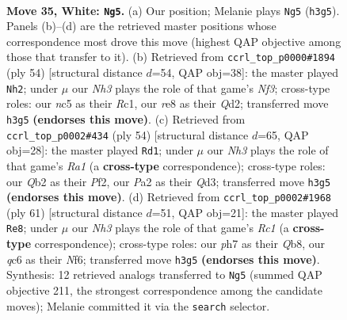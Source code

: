 \documentclass[11pt]{article}
\begin{document}
\clearpage

\begin{figure}[p]\centering
\begin{subfigure}{0.46\textwidth}\centering
\resizebox{\linewidth}{!}{%
\newchessgame
\chessboard[
  setfen={2b1r1k1/5p1p/2q3p1/2n1Pp2/p4P2/3B3N/PQP2KPP/6R1 w - - 6 35},
  showmover=false,
  pgfstyle=straightmove, color=movearrow, markmove={h3-g5}
]}
\caption{}
\end{subfigure}\hfill
\begin{subfigure}{0.46\textwidth}\centering
\resizebox{\linewidth}{!}{%
\newchessgame
\chessboard[
  setfen={2b2rk1/6pp/1pnq1p2/p2p4/3P2P1/1P3N1P/3QPPB1/2R3K1 w - - 3 28},
  showmover=false,
  pgfstyle=straightmove, color=movearrow, markmove={f3-h2}
]}
\caption{}
\end{subfigure}
\\[4pt]
\begin{subfigure}{0.46\textwidth}\centering
\resizebox{\linewidth}{!}{%
\newchessgame
\chessboard[
  setfen={3r2k1/1bq2pp1/1p1pp2p/6b1/1PPBP3/3QN2P/5PP1/R5K1 w - - 1 28},
  showmover=false,
  pgfstyle=straightmove, color=movearrow, markmove={a1-d1}
]}
\caption{}
\end{subfigure}\hfill
\begin{subfigure}{0.46\textwidth}\centering
\resizebox{\linewidth}{!}{%
\newchessgame
\chessboard[
  setfen={1qr3k1/5pp1/1p3nn1/p2b2Np/1P1N4/P3Q2P/5PP1/1R3BK1 b - - 1 31},
  showmover=false,
  pgfstyle=straightmove, color=movearrow, markmove={c8-e8}
]}
\caption{}
\end{subfigure}
\caption{\textbf{Move 35, White: \texttt{Ng5}.} (a) Our position; Melanie plays \texttt{Ng5} (\texttt{h3g5}). Panels (b)--(d) are the retrieved master positions whose correspondence most drove this move (highest QAP objective among those that transfer to it). (b) Retrieved from \texttt{ccrl\_top\_p0000\#1894} (ply 54) [structural distance $d$=54, QAP obj=38]: the master played \texttt{Nh2}; under $\mu$ our \emph{Nh3} plays the role of that game's \emph{Nf3}; cross-type roles: our \emph{n}c5 as their \emph{R}c1, our \emph{r}e8 as their \emph{Q}d2; transferred move \texttt{h3g5} \textbf{(endorses this move)}. (c) Retrieved from \texttt{ccrl\_top\_p0002\#434} (ply 54) [structural distance $d$=65, QAP obj=28]: the master played \texttt{Rd1}; under $\mu$ our \emph{Nh3} plays the role of that game's \emph{Ra1} (a \textbf{cross-type} correspondence); cross-type roles: our \emph{Q}b2 as their \emph{P}f2, our \emph{P}a2 as their \emph{Q}d3; transferred move \texttt{h3g5} \textbf{(endorses this move)}. (d) Retrieved from \texttt{ccrl\_top\_p0002\#1968} (ply 61) [structural distance $d$=51, QAP obj=21]: the master played \texttt{Re8}; under $\mu$ our \emph{Nh3} plays the role of that game's \emph{Rc1} (a \textbf{cross-type} correspondence); cross-type roles: our \emph{p}h7 as their \emph{Q}b8, our \emph{q}c6 as their \emph{N}f6; transferred move \texttt{h3g5} \textbf{(endorses this move)}. Synthesis: 12 retrieved analogs transferred to \texttt{Ng5} (summed QAP objective 211, the strongest correspondence among the candidate moves); Melanie committed it via the \texttt{search} selector.}
\label{fig:thought-m68}
\end{figure}
\end{document}
